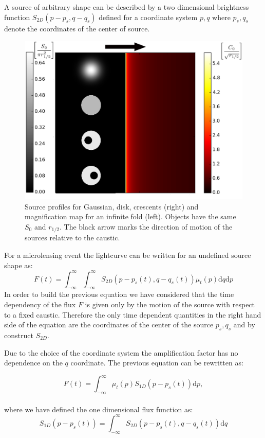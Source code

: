 \documentclass[usenatbib]{mn2e}
\begin{document}
A source of arbitrary shape can be described by a two dimensional brightness function $S_{2D}(p - p_s, q - q_s)$ defined for a coordinate system $p,q$ where $p_s, q_s$ denote the coordinates of the center of source.

\begin{figure}
\includegraphics[width = .49\textwidth]{figures/infinite_fold_ar.eps}
\caption{\label{fig:infinite_fold} Source profiles for Gaussian, disk,
  crescents (right) and magnification map for an infinite fold
  (left). Objects have the same $S_{0}$ and $r_{1/2}$. The black arrow marks the direction of motion of the
sources relative to the caustic.}
\end{figure}

For a microlensing event the lightcurve can be written for an
undefined source shape as:
\begin{equation}
 F(t) = \int_{-\infty}^\infty \int_{-\infty}^\infty S_{2D}(p-p_s(t), q-q_s(t)) \mu_t(p) \mathrm{d}q \mathrm{d}p
 \label{eqn:ft2d}
\end{equation}
In order to build the previous equation we have considered that the
time dependency of the flux $F$ is given only by the motion of the
source with respect to a fixed caustic. Therefore the only time
dependent quantities in the right hand side of the equation are the
coordinates of the center of the source $p_s,q_s$ and by construct
$S_{2D}$.

Due to the choice of the coordinate system the amplification factor has no dependence on the $q$ coordinate. The previous equation can be rewritten as:

\begin{equation}
 F(t) 
= \int_{-\infty}^\infty  \mu_t(p) S_{1D}\left(p-p_s(t)\right) \mathrm{d}p,
\label{eqn:ft}
\end{equation}
\\
where we have defined the one dimensional flux function as:
\begin{equation}
 S_{1D}(p-p_s(t)) = \int_{-\infty}^\infty S_{2D}(p-p_s(t), q-q_s(t)) \mathrm{d}q
\end{equation}
\end{document}
